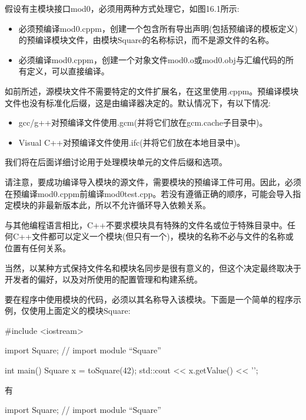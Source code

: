 假设有主模块接口mod0，必须用两种方式处理它，如图16.1所示:

\begin{itemize}
\item 
必须预编译mod0.cppm，创建一个包含所有导出声明(包括预编译的模板定义)的预编译模块文件，由模块Square的名称标识，而不是源文件的名称。

\item
必须编译mod0.cppm，创建一个对象文件mod0.o或mod0.obj与汇编代码的所有定义，可以直接编译。
\end{itemize}

如前所述，源模块文件不需要特定的文件扩展名，在这里使用.cppm。预编译模块文件也没有标准化后缀，这是由编译器决定的。默认情况下，有以下情况:

\begin{itemize}
\item 
gcc/g++对预编译文件使用.gcm(并将它们放在gcm.cache子目录中)。

\item
Visual C++对预编译文件使用.ifc(并将它们放在本地目录中)。
\end{itemize}

我们将在后面详细讨论用于处理模块单元的文件后缀和选项。

请注意，要成功编译导入模块的源文件，需要模块的预编译工件可用。因此，必须在预编译mod0.cppm前编译mod0test.cpp。若没有遵循正确的顺序，可能会导入指定模块的非最新版本此，所以不允许循环导入依赖关系。

与其他编程语言相比，C++不要求模块具有特殊的文件名或位于特殊目录中。任何C++文件都可以定义一个模块(但只有一个)，模块的名称不必与文件的名称或位置有任何关系。

当然，以某种方式保持文件名和模块名同步是很有意义的，但这个决定最终取决于开发者的偏好，以及对所使用的配置管理和构建系统。


要在程序中使用模块的代码，必须以其名称导入该模块。下面是一个简单的程序示例，仅使用上面定义的模块Square:


\begin{cpp}
#include <iostream>

import Square; // import module “Square”

int main()
{
	Square x = toSquare(42);
	std::cout << x.getValue() << '\n';
}
\end{cpp}

有

\begin{cpp}
import Square; // import module “Square”
\end{cpp}

